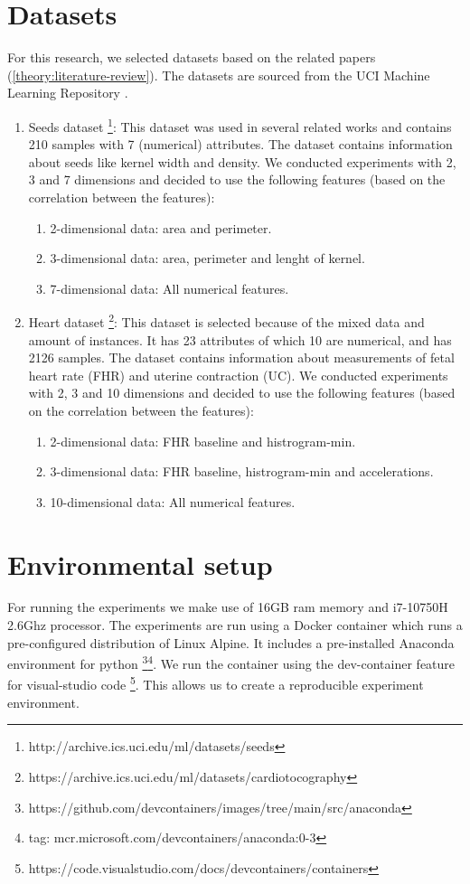 \section{Datasets} \label{datasets-section}
For this research, we selected datasets based on the related papers (\ref{theory:literature-review}).
The datasets are sourced from the UCI Machine Learning Repository \citep{noauthor_uci_nodate}.
\begin{enumerate}
  \item Seeds dataset \footnote{http://archive.ics.uci.edu/ml/datasets/seeds}: This dataset was used in several related works and contains 210 samples with 7 (numerical) attributes.
        The dataset contains information about seeds like kernel width and density.
        We conducted experiments with 2, 3 and 7 dimensions and decided to use the following features (based on the correlation between the features):
        \begin{enumerate}
          \item 2-dimensional data: area and perimeter.
          \item 3-dimensional data: area, perimeter and lenght of kernel.
          \item 7-dimensional data: All numerical features.
        \end{enumerate}
  \item Heart dataset \footnote{https://archive.ics.uci.edu/ml/datasets/cardiotocography}: This dataset is selected because of the mixed data and amount of instances.
        It has 23 attributes of which 10 are numerical, and has 2126 samples.
        The dataset contains information about measurements of fetal heart rate (FHR) and uterine contraction (UC).
        We conducted experiments with 2, 3 and 10 dimensions and decided to use the following features (based on the correlation between the features):
        \begin{enumerate}
          \item 2-dimensional data: FHR baseline and histrogram-min.
          \item 3-dimensional data: FHR baseline, histrogram-min and accelerations.
          \item 10-dimensional data: All numerical features.
        \end{enumerate}
\end{enumerate}
\section{Environmental setup}
For running the experiments we make use of 16GB ram memory and i7-10750H 2.6Ghz processor.
The experiments are run using a Docker container which runs a pre-configured distribution of Linux Alpine.
It includes a pre-installed Anaconda environment for python \footnote{https://github.com/devcontainers/images/tree/main/src/anaconda}\footnote{tag: mcr.microsoft.com/devcontainers/anaconda:0-3}.
We run the container using the dev-container feature for visual-studio code \footnote{https://code.visualstudio.com/docs/devcontainers/containers}.
This allows us to create a reproducible experiment environment.
